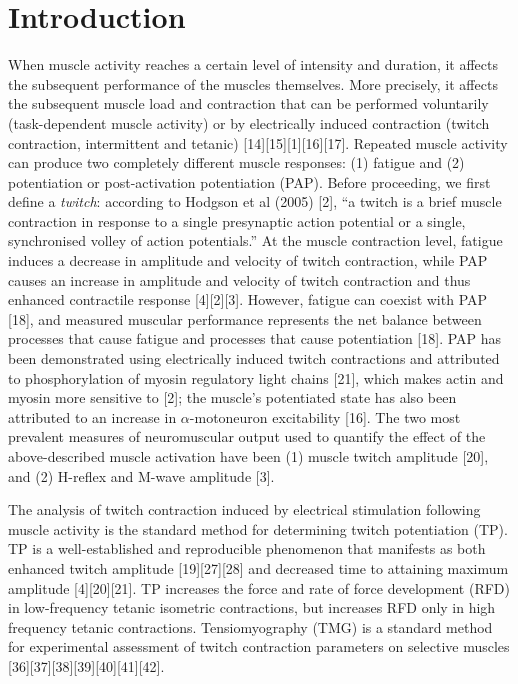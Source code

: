 \documentclass[utf8]{style/FrontiersinHarvard}
\begin{document}
\section{Introduction}
When muscle activity reaches a certain level of intensity and duration, it affects the subsequent performance of the muscles themselves.
More precisely, it affects the subsequent muscle load and contraction that can be performed voluntarily (task-dependent muscle activity) or by electrically induced contraction (twitch contraction, intermittent and tetanic) [14][15][1][16][17].
Repeated muscle activity can produce two completely different muscle responses: (1) fatigue and (2) potentiation or post-activation potentiation (PAP). 
Before proceeding, we first define a \textit{twitch}:
according to Hodgson et al (2005) [2], ``a twitch is a brief muscle contraction in response to a single presynaptic action potential or a single, synchronised volley of action potentials.''
At the muscle contraction level, fatigue induces a decrease in amplitude and velocity of twitch contraction, while PAP causes an increase in amplitude and velocity of twitch contraction and thus enhanced contractile response [4][2][3].
However, fatigue can coexist with PAP [18], and measured muscular performance represents the net balance between processes that cause fatigue and processes that cause potentiation [18].
PAP has been demonstrated using electrically induced twitch contractions and attributed to phosphorylation of myosin regulatory light chains [21], which makes actin and myosin more sensitive to  [2];
the muscle's potentiated state has also been attributed to an increase in $ \alpha $-motoneuron excitability [16].
The two most prevalent measures of neuromuscular output used to quantify the effect of the above-described muscle activation have been (1) muscle twitch amplitude [20], and (2) H-reflex and M-wave amplitude [3].

The analysis of twitch contraction induced by electrical stimulation following muscle activity is the standard method for determining twitch potentiation (TP).
TP is a well-established and reproducible phenomenon that manifests as both enhanced twitch amplitude [19][27][28] and decreased time to attaining maximum amplitude [4][20][21].
TP increases the force and rate of force development (RFD) in low-frequency tetanic isometric contractions, but increases RFD only in high frequency tetanic contractions.
Tensiomyography (TMG) is a standard method for experimental assessment of twitch contraction parameters on selective muscles [36][37][38][39][40][41][42].
\end{document}
